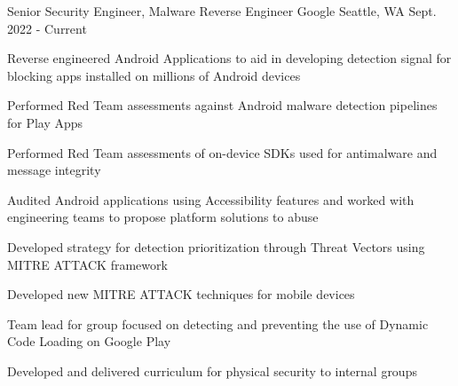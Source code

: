 


\begin{cventries}



\cventry
{Senior Security Engineer, Malware Reverse Engineer} %
{Google}
{Seattle, WA}
{Sept. 2022 - Current}
{
    \begin{cvitems}
        \item {Reverse engineered Android Applications to aid in developing detection signal for blocking apps installed on millions of Android devices}
        \item {Performed Red Team assessments against Android malware detection pipelines for Play Apps}
        \item {Performed Red Team assessments of on-device SDKs used for antimalware and message integrity}
        \item {Audited Android applications using Accessibility features and worked with engineering teams to propose platform solutions to abuse}
        \item {Developed strategy for detection prioritization through Threat Vectors using MITRE ATTACK framework}
        \item {Developed new MITRE ATTACK techniques for mobile devices}
        \item {Team lead for group focused on detecting and preventing the use of Dynamic Code Loading on Google Play}
        \item {Developed and delivered curriculum for physical security to internal groups}
    \end{cvitems}
}


\end{cventries}
